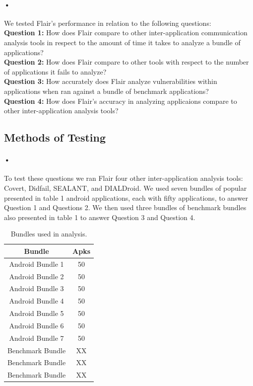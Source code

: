 \documentclass[twocolumn]{article}
\begin{document}
\paragraph{•}
	We tested Flair's performance in relation to the following questions:\\
	\textbf{Question 1:} How does Flair compare to other inter-application communication analysis tools in respect to the amount of time it takes to analyze a bundle of applications?\\
	\textbf{Question 2:} How does Flair compare to other tools with respect to the number of applications it fails to analyze?\\
	\textbf{Question 3:} How accurately does Flair analyze vulnerabilities within applications when ran against a bundle of benchmark applications?\\
	\textbf{Question 4:} How does Flair's accuracy in analyzing applicaions compare to other inter-application analysis tools?\\

\subsection{Methods of Testing} \label{methods}
\paragraph{•}
	To test these questions we ran Flair four other inter-application analysis tools: Covert, Didfail, SEALANT, and DIALDroid. We used seven bundles of popular presented in table 1 android applications, each with fifty applications, to answer Question 1 and Questions 2. We then used three bundles of benchmark bundles also presented in table 1 to answer Question 3 and Question 4. 


\begin{table}[h]
\begin{center}
\begin{tabular}{ |c c| }
	\hline
	Bundle & Apks\\
	\hline
	Android Bundle 1 & 50\\
	Android Bundle 2 & 50\\
	Android Bundle 3 & 50\\
	Android Bundle 4 & 50\\
	Android Bundle 5 & 50\\
	Android Bundle 6 & 50\\
	Android Bundle 7 & 50\\
	Benchmark Bundle & XX\\
	Benchmark Bundle & XX\\
	Benchmark Bundle & XX\\
	\hline
\end{tabular}
\end{center}
\caption{Bundles used in analysis.}
\label{table:1}
\end{table}
\end{document}
